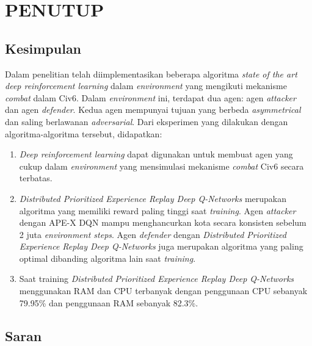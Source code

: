 \chapter{PENUTUP}
\label{chap:penutup}


\section{Kesimpulan}
\label{sec:kesimpulan}

Dalam penelitian telah diimplementasikan beberapa algoritma \emph{state of the art} \emph{deep reinforcement learning} dalam \emph{environment}
yang mengikuti mekanisme \emph{combat} dalam Civ6.
Dalam \emph{environment} ini, terdapat dua agen: agen \emph{attacker} dan agen \emph{defender}.
Kedua agen mempunyai tujuan yang berbeda \emph{asymmetrical} dan saling berlawanan \emph{adversarial}.
Dari eksperimen yang dilakukan dengan algoritma-algoritma tersebut, didapatkan:

\begin{enumerate}[nolistsep]

  \item \emph{Deep reinforcement learning} dapat digunakan untuk membuat agen yang cukup dalam \emph{environment} yang mensimulasi mekanisme \emph{combat}
  Civ6 secara terbatas.

  \item \emph{Distributed Prioritized Experience Replay Deep Q-Networks} merupakan algoritma yang memiliki reward paling tinggi saat \emph{training}. Agen \emph{attacker} dengan APE-X DQN mampu
  menghancurkan kota secara konsisten sebelum 2 juta \emph{environment steps}.
  Agen \emph{defender} dengan \emph{Distributed Prioritized Experience Replay Deep Q-Networks} juga merupakan algoritma yang paling optimal
  dibanding algoritma lain saat \emph{training}.

  \item Saat training \emph{Distributed Prioritized Experience Replay Deep Q-Networks} menggunakan RAM dan CPU terbanyak dengan penggunaan CPU sebanyak 79.95\% dan penggunaan
  RAM sebanyak 82.3\%.

\end{enumerate}

\section{Saran}
\label{chap:saran}

